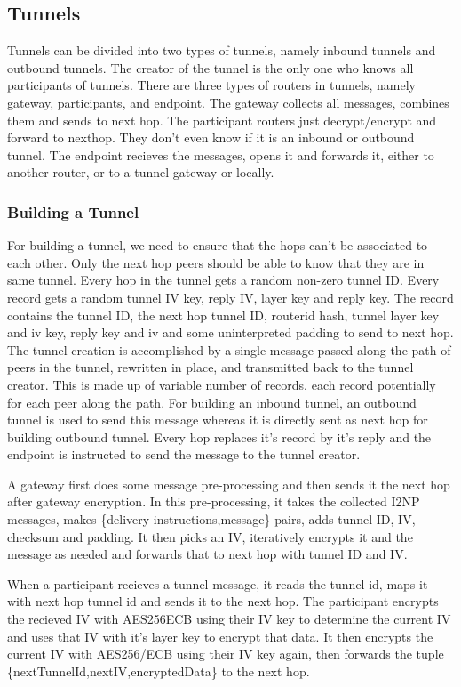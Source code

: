 \documentclass{main}
\begin{document}
\subsection{Tunnels}
Tunnels can be divided into two types of tunnels, namely inbound tunnels and outbound tunnels. The creator of the
tunnel is the only one who knows all participants of tunnels. There are three types of routers in tunnels, namely
gateway, participants, and endpoint. The gateway collects all messages, combines them and sends to next hop. The
participant routers just decrypt/encrypt and forward to nexthop. They don't even know if it is an inbound or outbound
tunnel. The endpoint recieves the messages, opens it and forwards it, either to another router, or to a tunnel gateway
or locally.

\subsubsection*{Building a Tunnel}
For building a tunnel, we need to ensure that the hops can't be associated to each other. Only the next hop peers
should be able to know that they are in same tunnel. Every hop in the tunnel gets a random non-zero tunnel ID. Every
record gets a random tunnel IV key, reply IV, layer key and reply key. The record contains the tunnel ID, the next
hop tunnel ID, routerid hash, tunnel layer key and iv key, reply key and iv and some uninterpreted padding to send to next hop.
The tunnel creation is accomplished by a single message passed along the path of peers in the tunnel, rewritten
in place, and transmitted back to the tunnel creator. This is made up of variable number of records, each record
potentially for each peer along the path. For building an inbound tunnel, an outbound tunnel is used to send this message
whereas it is directly sent as next hop for building outbound tunnel. Every hop replaces it's record by it's reply and
the endpoint is instructed to send the message to the tunnel creator.

A gateway first does some message pre-processing and then sends it the next hop after gateway encryption. In this pre-processing,
it takes the collected I2NP messages, makes \{delivery instructions,message\} pairs, adds tunnel ID, IV, checksum and padding. It
then picks an IV, iteratively encrypts it and the message as needed and forwards that to next hop with tunnel ID and IV.

When a participant recieves a tunnel message, it reads the tunnel
id, maps it with next hop tunnel id and sends it to the next hop. The participant encrypts the recieved IV with AES256ECB
using their IV key to determine the current IV and uses that IV with it's layer key to encrypt that data. It then encrypts 
the current IV with AES256/ECB using their IV key again, then forwards the tuple \{nextTunnelId,nextIV,encryptedData\} to the
next hop.
\end{document}
